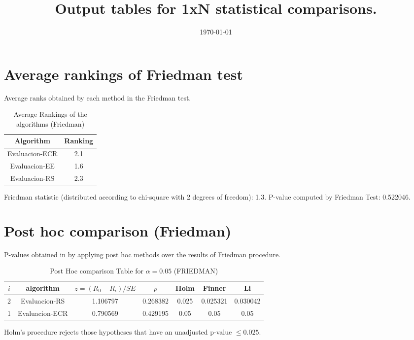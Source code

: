 \documentclass[a4paper,10pt]{article}
\title{Output tables for 1xN statistical comparisons.}
\author{}
\date{\today}
\begin{document}
\begin{landscape}
\pagestyle{empty}
\maketitle
\thispagestyle{empty}

\section{Average rankings of Friedman test}


Average ranks obtained by each method in the Friedman test.

\begin{table}[!htp]
\centering
\begin{tabular}{|c|c|}\hline
Algorithm&Ranking\\\hline
Evaluacion-ECR&2.1\\Evaluacion-EE&1.6\\Evaluacion-RS&2.3\\\hline\end{tabular}
\caption{Average Rankings of the algorithms (Friedman)}
\end{table}

Friedman statistic (distributed according to chi-square with 2 degrees of freedom): 1.3. \newline P-value computed by Friedman Test: 0.522046.\newline


\newpage

\section{Post hoc comparison (Friedman)}


P-values obtained in by applying post hoc methods over the results of Friedman procedure.

\begin{table}[!htp]
\centering\footnotesize
\begin{tabular}{ccccccc}
$i$&algorithm&$z=(R_0 - R_i)/SE$&$p$&Holm &Finner&Li\\
\hline2&Evaluacion-RS&1.106797&0.268382&0.025&0.025321&0.030042\\1&Evaluacion-ECR&0.790569&0.429195&0.05&0.05&0.05\\\hline
\end{tabular}
\caption{Post Hoc comparison Table for $\alpha=0.05$ (FRIEDMAN)}
\end{table}Holm's procedure rejects those hypotheses that have an unadjusted p-value $\le0.025$.


\end{landscape}
\end{document}

